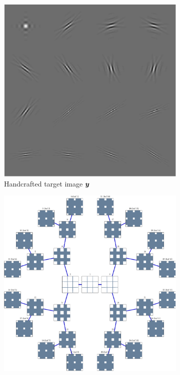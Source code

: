 \begin{figure}[!h] \centering
\begin{subfigure}[b]{0.325\textwidth}\centering
\includegraphics[width=\textwidth]{figures/tree-learn/target.pdf} 
	\caption{Handcrafted target image $\bm{y}$}
\end{subfigure}
\begin{subfigure}[b]{0.325\textwidth}\centering
\includegraphics[width=1\textwidth]{figures/tree-learn/xp_learnsupp256_curvelet_decomp3[tree-binary_dpth4]_supp-generic3x3_[fixed-supports]_tree.pdf}

\end{subfigure}
\end{figure}
